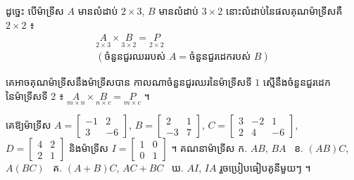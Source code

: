 ដូច្នេះ បើម៉ាទ្រីស $A$ មានលំដាប់ $2 \times 3$, $B$ មានលំដាប់ $3 \times 2$ នោះលំដាប់នៃផលគុណម៉ាទ្រីសគឺ $2 \times 2$ ៖
\[
\begin{gathered}
\underset{2 \times 3}{A} \times \underset{3 \times 2}{B} = \underset{2 \times 2}{P}\\
(\text{ចំនួនជួរឈររបស់ } A = \text{ចំនួនជួរដេករបស់ } B)
\end{gathered}
\]

\begin{formulaBox}[ជាទូទៅ]
គេអាចគុណម៉ាទ្រីសនឹងម៉ាទ្រីសបាន កាលណាចំនួនជួរឈរនៃម៉ាទ្រីសទី $1$ ស្មើនឹងចំនួនជួរដេកនៃម៉ាទ្រីសទី $2$ ៖ $\underset{m \times n}{A} \times \underset{n \times c}{B} = \underset{m \times c}{P}$ ។
\end{formulaBox}

\begin{example}[លំហាត់គំរូ ៦]
គេឱ្យម៉ាទ្រីស $A = \begin{bmatrix} -1 & 2\\ 3 & -6 \end{bmatrix}$, $B = \begin{bmatrix} 2 & 1\\ -3 & 7 \end{bmatrix}$, $C = \begin{bmatrix} 3 & -2 & 1\\ 2 & 4 & -6 \end{bmatrix}$, $D = \begin{bmatrix} 4 & 2\\ 2 & 1 \end{bmatrix}$ និងម៉ាទ្រីស $I = \begin{bmatrix} 1 & 0\\ 0 & 1 \end{bmatrix}$ ។ គណនាម៉ាទ្រីស ក. $AB$, $BA$ \ ខ. $(AB)C$, $A(BC)$ \ គ. $(A + B)C$, $AC + BC$ \ ឃ. $AI$, $IA$ រួចប្រៀបធៀបគូនីមួយៗ ។
\end{example}
\ans
